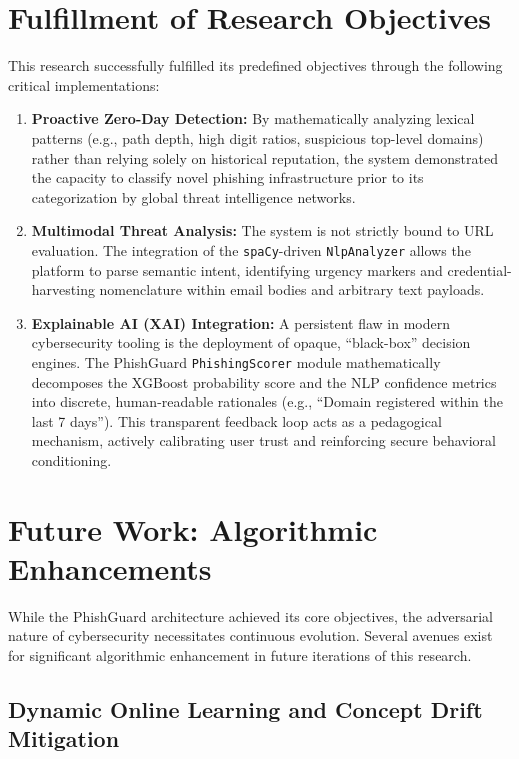 \section{Fulfillment of Research
Objectives}\label{fulfillment-of-research-objectives}

This research successfully fulfilled its predefined objectives through
the following critical implementations:

\begin{enumerate}

\item
  \textbf{Proactive Zero-Day Detection:} By mathematically analyzing
  lexical patterns (e.g., path depth, high digit ratios, suspicious
  top-level domains) rather than relying solely on historical
  reputation, the system demonstrated the capacity to classify novel
  phishing infrastructure prior to its categorization by global threat
  intelligence networks.
\item
  \textbf{Multimodal Threat Analysis:} The system is not strictly bound
  to URL evaluation. The integration of the \texttt{spaCy}-driven
  \texttt{NlpAnalyzer} allows the platform to parse semantic intent,
  identifying urgency markers and credential-harvesting nomenclature
  within email bodies and arbitrary text payloads.
\item
  \textbf{Explainable AI (XAI) Integration:} A persistent flaw in modern
  cybersecurity tooling is the deployment of opaque, ``black-box''
  decision engines. The PhishGuard \texttt{PhishingScorer} module
  mathematically decomposes the XGBoost probability score and the NLP
  confidence metrics into discrete, human-readable rationales (e.g.,
  ``Domain registered within the last 7 days''). This transparent
  feedback loop acts as a pedagogical mechanism, actively calibrating
  user trust and reinforcing secure behavioral conditioning.
\end{enumerate}

\section{Future Work: Algorithmic
Enhancements}\label{future-work-algorithmic-enhancements}

While the PhishGuard architecture achieved its core objectives, the
adversarial nature of cybersecurity necessitates continuous evolution.
Several avenues exist for significant algorithmic enhancement in future
iterations of this research.

\subsection{Dynamic Online Learning and Concept Drift
Mitigation}\label{dynamic-online-learning-and-concept-drift-mitigation}

